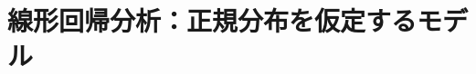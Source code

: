 \documentclass[a4j,11pt,mc]{jreport}
\begin{document}
%
%
%
%
%
%
%
%
%
%
%
%
%
%
%
%
%
%
%
%
%
%
%
%
%
%
%
%
%
%
%
%
%
%
%
%
%
%
%
%
%
%
%
%
%
%
%





	\section{線形回帰分析：正規分布を仮定するモデル}
\end{document}
